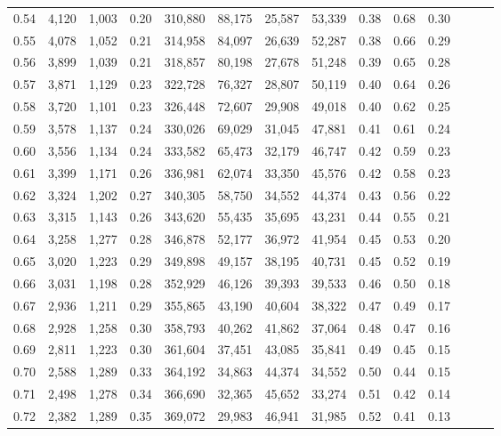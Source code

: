 \begin{tabular}{rrrrrrrrrrrrrr}
0.54 &  4,120 &  1,003 &  0.20 &  310,880 &   88,175 &  25,587 &  53,339 &  0.38 &  0.68 &      0.30 \\
0.55 &  4,078 &  1,052 &  0.21 &  314,958 &   84,097 &  26,639 &  52,287 &  0.38 &  0.66 &      0.29 \\
0.56 &  3,899 &  1,039 &  0.21 &  318,857 &   80,198 &  27,678 &  51,248 &  0.39 &  0.65 &      0.28 \\
0.57 &  3,871 &  1,129 &  0.23 &  322,728 &   76,327 &  28,807 &  50,119 &  0.40 &  0.64 &      0.26 \\
0.58 &  3,720 &  1,101 &  0.23 &  326,448 &   72,607 &  29,908 &  49,018 &  0.40 &  0.62 &      0.25 \\
0.59 &  3,578 &  1,137 &  0.24 &  330,026 &   69,029 &  31,045 &  47,881 &  0.41 &  0.61 &      0.24 \\
0.60 &  3,556 &  1,134 &  0.24 &  333,582 &   65,473 &  32,179 &  46,747 &  0.42 &  0.59 &      0.23 \\
0.61 &  3,399 &  1,171 &  0.26 &  336,981 &   62,074 &  33,350 &  45,576 &  0.42 &  0.58 &      0.23 \\
0.62 &  3,324 &  1,202 &  0.27 &  340,305 &   58,750 &  34,552 &  44,374 &  0.43 &  0.56 &      0.22 \\
0.63 &  3,315 &  1,143 &  0.26 &  343,620 &   55,435 &  35,695 &  43,231 &  0.44 &  0.55 &      0.21 \\
0.64 &  3,258 &  1,277 &  0.28 &  346,878 &   52,177 &  36,972 &  41,954 &  0.45 &  0.53 &      0.20 \\
0.65 &  3,020 &  1,223 &  0.29 &  349,898 &   49,157 &  38,195 &  40,731 &  0.45 &  0.52 &      0.19 \\
0.66 &  3,031 &  1,198 &  0.28 &  352,929 &   46,126 &  39,393 &  39,533 &  0.46 &  0.50 &      0.18 \\
0.67 &  2,936 &  1,211 &  0.29 &  355,865 &   43,190 &  40,604 &  38,322 &  0.47 &  0.49 &      0.17 \\
0.68 &  2,928 &  1,258 &  0.30 &  358,793 &   40,262 &  41,862 &  37,064 &  0.48 &  0.47 &      0.16 \\
0.69 &  2,811 &  1,223 &  0.30 &  361,604 &   37,451 &  43,085 &  35,841 &  0.49 &  0.45 &      0.15 \\
0.70 &  2,588 &  1,289 &  0.33 &  364,192 &   34,863 &  44,374 &  34,552 &  0.50 &  0.44 &      0.15 \\
0.71 &  2,498 &  1,278 &  0.34 &  366,690 &   32,365 &  45,652 &  33,274 &  0.51 &  0.42 &      0.14 \\
0.72 &  2,382 &  1,289 &  0.35 &  369,072 &   29,983 &  46,941 &  31,985 &  0.52 &  0.41 &      0.13 \\

\end{tabular}
